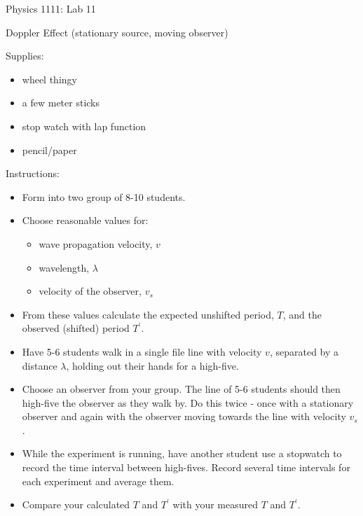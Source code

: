 \documentclass[12pt]{article}
\begin{document}
{\centering
\large Physics 1111: Lab 11 \par
\large Doppler Effect (stationary source, moving observer) \par
}
\hfill \break \vspace{-4mm}

Supplies:
\begin{itemize}
\item wheel thingy
\item a few meter sticks
\item stop watch with lap function
\item pencil/paper
\end{itemize}

Instructions:
\begin{itemize}
\item Form into two group of 8-10 students.
\item Choose reasonable values for:
\begin{itemize}
\item wave propagation velocity, $v$
\item wavelength, $\lambda$
\item velocity of the observer, $v_s$
\end{itemize}
\item From these values calculate the expected unshifted period, $T$, and the observed (shifted) period $T^\prime$.
\item Have 5-6 students walk in a single file line with velocity $v$, separated by a distance $\lambda$, holding out their hands for a high-five.
\item Choose an observer from your group. The line of 5-6 students should then high-five the observer as they walk by. Do this twice - once with a stationary observer and again with the observer moving towards the line with velocity $v_s$.
\item While the experiment is running, have another student use a stopwatch to record the time interval between high-fives. Record several time intervals for each experiment and average them.
\item Compare your calculated $T$ and $T^\prime$ with your measured $T$ and $T^\prime$.
\end{itemize}
\end{document}
